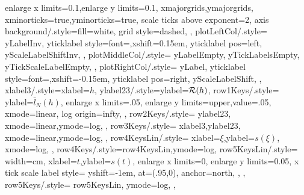 {{{                %
                enlarge x limits=0.1,enlarge y limits=0.1,
                xmajorgrids,ymajorgrids,
                xminorticks=true,yminorticks=true,
                scale ticks above exponent=2,
                axis background/.style={fill=white},
                grid style={dashed},
              },
              plotLeftCol/.style={
                yLabelInv,
                yticklabel style={font=\textsize{\tickSize},xshift=0.15em},
                yticklabel pos=left,
                yScaleLabelShiftInv,
              },
              plotMiddleCol/.style={
                yLabelEmpty,
                yTickLabelsEmpty,
                yTickScaleLabelEmpty,
              },
              plotRightCol/.style={
                yLabel,
                yticklabel style={font=\textsize{\tickSize},xshift=-0.15em},
                yticklabel pos=right,
                yScaleLabelShift,
              },
              xlabel3/.style={xlabel={\(h\)}},
              ylabel23/.style={ylabel={\(\operatorname{\mathcal R}(h)\)}},
              row1Keys/.style={
                ylabel={\(\bar l_N(h)\)},
                enlarge x limits=.05,
                enlarge y limits={upper,value=.05},
                xmode=linear,
                log origin=infty,
              },
              row2Keys/.style={
                ylabel23,
                xmode=linear,ymode=log,
              },
              row3Keys/.style={
                xlabel3,ylabel23,
                xmode=linear,ymode=log,
              },
              row4KeysLin/.style={
                xlabel={\(\xi\)},ylabel={\(s(\xi)\)},
                xmode=log,
              },
              row4Keys/.style={row4KeysLin,ymode=log},
              row5KeysLin/.style={
                width=\plotLastWidth cm,
                xlabel={\(t\)},ylabel={\(s(t)\)},
                enlarge x limits=0,
                enlarge y limits=0.05,
                x tick scale label style={
                  yshift=-1em,
                  at={(.95,0)},
                  anchor=north,
                },
              },
              row5Keys/.style={
                row5KeysLin,
                ymode=log,
              },
            }
        }

